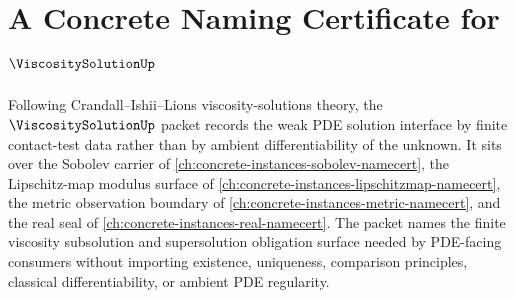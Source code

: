 \chapter{A Concrete Naming Certificate for $\ViscositySolutionUp$}
\label{ch:concrete-instances-viscosity-solution-namecert}

Following Crandall--Ishii--Lions viscosity-solutions theory, the $\ViscositySolutionUp$ packet records the weak PDE solution interface by finite contact-test data rather than by ambient differentiability of the unknown. It sits over the Sobolev carrier of \autoref{ch:concrete-instances-sobolev-namecert}, the Lipschitz-map modulus surface of \autoref{ch:concrete-instances-lipschitzmap-namecert}, the metric observation boundary of \autoref{ch:concrete-instances-metric-namecert}, and the real seal of \autoref{ch:concrete-instances-real-namecert}. The packet names the finite viscosity subsolution and supersolution obligation surface needed by PDE-facing consumers without importing existence, uniqueness, comparison principles, classical differentiability, or ambient PDE regularity.

